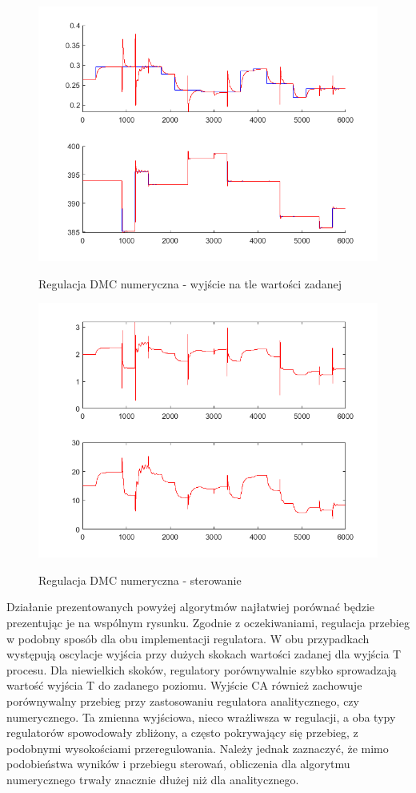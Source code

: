 \begin{figure}[h!]
	\centering
	\includegraphics[width=.6\linewidth]{img/yDMCnum.png}
	\label{ch2:dmcnum}
	\caption{Regulacja DMC numeryczna - wyjście na tle wartości zadanej}
\end{figure}
\begin{figure}[h!]
	\centering
	\includegraphics[width=.6\linewidth]{img/uDMCnum.png}
	\label{ch2:dmcnumster}
	\caption{Regulacja DMC numeryczna - sterowanie}
\end{figure}
\newpage
Działanie prezentowanych powyżej algorytmów najłatwiej porównać będzie prezentując je na wspólnym rysunku. 
Zgodnie z oczekiwaniami, regulacja przebieg w podobny sposób dla obu implementacji regulatora. W obu przypadkach występują oscylacje wyjścia przy dużych skokach wartości zadanej dla wyjścia T procesu. Dla niewielkich skoków, regulatory porównywalnie szybko sprowadzają wartość wyjścia T do zadanego poziomu. Wyjście CA również zachowuje porównywalny przebieg przy zastosowaniu regulatora analitycznego, czy numerycznego. Ta zmienna wyjściowa, nieco wrażliwsza w regulacji, a oba typy regulatorów spowodowały zbliżony, a często pokrywający się przebieg, z podobnymi wysokościami przeregulowania.
Należy jednak zaznaczyć, że mimo podobieństwa wyników i przebiegu sterowań, obliczenia dla algorytmu numerycznego trwały znacznie dłużej niż dla analitycznego.
